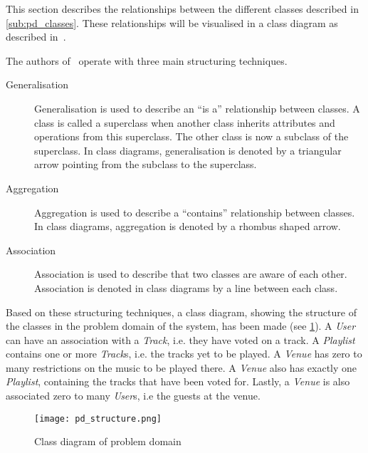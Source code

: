 This section describes the relationships between the different classes
described in \cref{sub:pd_classes}. These relationships will be
visualised in a class diagram as described
in~\cite{mathiassen2001objektorienteret}.

The authors of~\cite{mathiassen2001objektorienteret} operate with three
main structuring techniques.

\begin{description}
\item[Generalisation] Generalisation is used to describe an \enquote{is a}
  relationship between classes. A class is called a
  superclass when another class inherits attributes and operations
  from this superclass. The other class is now a subclass of the
  superclass. In class diagrams, generalisation is denoted by a
  triangular arrow pointing from the subclass to the superclass.
\item[Aggregation] Aggregation is used to describe a
  \enquote{contains} relationship between classes. In class diagrams,
  aggregation is denoted by a rhombus shaped arrow.
\item[Association] Association is used to describe that two classes
  are aware of each other. Association is denoted in class diagrams by
  a line between each class.
\end{description} 

Based on these structuring techniques, a class diagram, showing the structure of the classes in the problem domain of the system, has been made (see \cref{fig:pd_structure}). A \textit{User} can have an association with a \textit{Track}, i.e. they have voted on a track. A \textit{Playlist} contains one or more \textit{Track}s, i.e. the tracks yet to be played. A \textit{Venue} has zero to many restrictions on the music to be played there. A \textit{Venue} also has exactly one \textit{Playlist}, containing the tracks that have been voted for. Lastly, a \textit{Venue} is also associated zero to many \textit{User}s, i.e the guests at the venue.

\begin{figure}
  \centering
  \texttt{[image: pd\_structure.png]}
  \caption{Class diagram of problem domain}\label{fig:pd_structure}
\end{figure}
